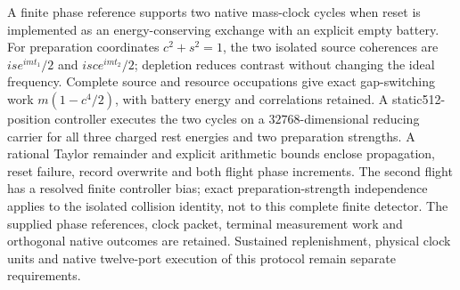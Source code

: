 A finite phase reference supports two native mass-clock cycles when reset is
implemented as an energy-conserving exchange with an explicit empty battery.
For preparation coordinates $c^2+s^2=1$, the two isolated source coherences
are $is e^{imt_1}/2$ and $isc e^{imt_2}/2$; depletion reduces contrast without
changing the ideal frequency. Complete source and resource occupations give
exact gap-switching work $m(1-c^4/2)$, with battery energy and correlations
retained. A static512-position controller executes the two cycles on a
$32768$-dimensional reducing carrier for all three charged rest energies and
two preparation strengths. A rational Taylor remainder and explicit arithmetic
bounds enclose propagation, reset failure, record overwrite and both flight
phase increments. The second flight has a resolved finite controller bias;
exact preparation-strength independence applies to the isolated collision
identity, not to this complete finite detector. The supplied phase references,
clock packet, terminal measurement work and orthogonal native outcomes are
retained. Sustained replenishment, physical clock units and native twelve-port
execution of this protocol remain separate requirements.
